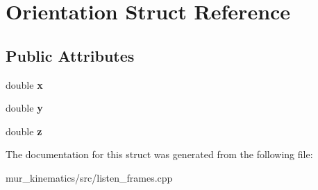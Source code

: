 \hypertarget{structOrientation}{}\section{Orientation Struct Reference}
\label{structOrientation}
\subsection*{Public Attributes}
\begin{DoxyCompactItemize}
\item 
\mbox{\label{structOrientation_a5afb9011203e023f5191b5512a1b5393}} 
double {\bfseries x}
\item 
\mbox{\label{structOrientation_a799925b012c217b99ced1e8d67ce8fac}} 
double {\bfseries y}
\item 
\mbox{\label{structOrientation_a5868530129dc0877d517a3a92074a79a}} 
double {\bfseries z}
\end{DoxyCompactItemize}


The documentation for this struct was generated from the following file\+:\begin{DoxyCompactItemize}
\item 
mur\+\_\+kinematics/src/listen\+\_\+frames.\+cpp\end{DoxyCompactItemize}
